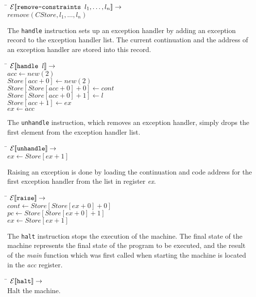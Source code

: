 \begin{tabbing}
\qquad \= \quad \kill
${\mathcal{E}{\normalfont [\![} \text{{\tt remove-constraints }} l_1,\dots,l_n {\normalfont ]\!]}} \rightarrow$\\
\>$remove (CStore, l_1,\dots,l_n)$
\end{tabbing}
%
The {\tt handle} instruction sets up an exception handler by adding an
exception record to the exception handler list.  The current
continuation and the address of an exception handler are stored into
this record.
%
\begin{tabbing}
\qquad \= \quad \kill
${\mathcal{E}{\normalfont [\![} \text{{\tt handle }} l {\normalfont ]\!]}} \rightarrow$\\
\>$acc \leftarrow new(2)$\\
\>$Store[acc+0]\leftarrow new(2)$\\
\>$Store[Store[acc+0]+0]\leftarrow cont$\\
\>$Store[Store[acc+0]+1]\leftarrow l$\\
\>$Store[acc+1]\leftarrow ex$\\
\>$ex\leftarrow acc$
\end{tabbing}
%
The {\tt unhandle} instruction, which removes an exception handler,
simply drops the first element from the exception handler list.
%
\begin{tabbing}
\qquad \= \quad \kill
${\mathcal{E}{\normalfont [\![} \text{{\tt unhandle}} {\normalfont ]\!]}} \rightarrow$\\
\>$ex\leftarrow Store[ex+1]$
\end{tabbing}
%
Raising an exception is done by loading the continuation and code
address for the first exception handler from the list in register {\em
  ex}.

\begin{tabbing}
\qquad \= \quad \kill
${\mathcal{E}{\normalfont [\![} \text{{\tt raise}} {\normalfont ]\!]}} \rightarrow$\\
\>$cont \leftarrow Store[Store[ex+0]+0]$\\
\>$pc \leftarrow Store[Store[ex+0]+1]$\\
\>$ex \leftarrow Store[ex+1]$
\end{tabbing}
%
The {\tt halt} instruction stops the execution of the machine.  The
final state of the machine represents the final state of the program
to be executed, and the result of the {\em main} function which was
first called when starting the machine is located in the {\em acc}
register.

\begin{tabbing}
\qquad \= \quad \kill
${\mathcal{E}{\normalfont [\![} \text{{\tt halt}} {\normalfont ]\!]}} \rightarrow$\\
\>Halt the machine.
\end{tabbing}

